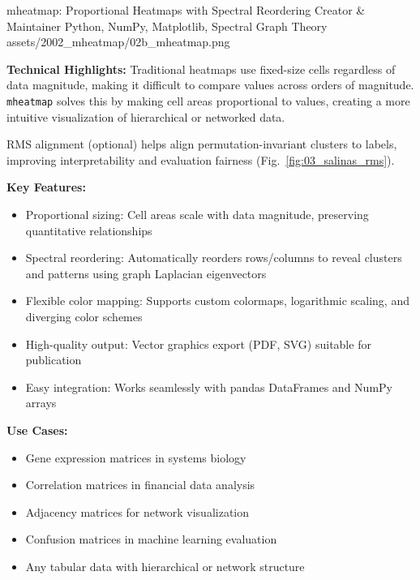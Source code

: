 \ProjectEntry
{mheatmap: Proportional Heatmaps with Spectral Reordering}
{Creator \& Maintainer}
{Python, NumPy, Matplotlib, Spectral Graph Theory}
{
}
{assets/2002_mheatmap/02b_mheatmap.png}
{ \quad {}}
{ }

\textbf{Technical Highlights:}
Traditional heatmaps use fixed-size cells regardless of data magnitude, making it difficult to compare values across orders of magnitude. \texttt{mheatmap} solves this by making cell areas proportional to values, creating a more intuitive visualization of hierarchical or networked data.

RMS alignment (optional) helps align permutation-invariant clusters to labels, improving interpretability and evaluation fairness (Fig.~\ref{fig:03_salinas_rms}).

\textbf{Key Features:}
\begin{itemize}[leftmargin=1.2em, itemsep=0.1em]
  \item Proportional sizing: Cell areas scale with data magnitude, preserving quantitative relationships
  \item Spectral reordering: Automatically reorders rows/columns to reveal clusters and patterns using graph Laplacian eigenvectors
  \item Flexible color mapping: Supports custom colormaps, logarithmic scaling, and diverging color schemes
  \item High-quality output: Vector graphics export (PDF, SVG) suitable for publication
  \item Easy integration: Works seamlessly with pandas DataFrames and NumPy arrays
\end{itemize}

\textbf{Use Cases:}
\begin{itemize}[leftmargin=1.2em, itemsep=0.1em]
  \item Gene expression matrices in systems biology
  \item Correlation matrices in financial data analysis
  \item Adjacency matrices for network visualization
  \item Confusion matrices in machine learning evaluation
  \item Any tabular data with hierarchical or network structure
\end{itemize}

